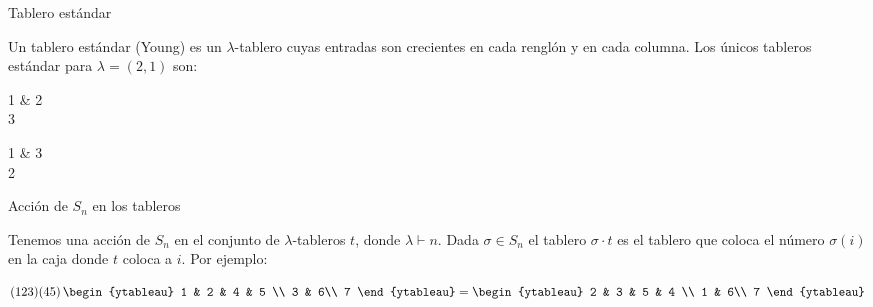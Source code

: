 \documentclass[final,xcolor=svgnames]{beamer}
\begin{document}
\begin{frame}{}
\begin{columns}
\begin{column}{0.5\textwidth}
      \begin{block}{Tablero estándar}
        \begin{minipage}{0.68\linewidth}
          Un \alert{tablero estándar (Young)} es un $\lambda$-tablero
          cuyas entradas son crecientes en cada renglón y en cada
          columna.  Los únicos tableros estándar para $\lambda=(2,1)$
          son:
        \end{minipage}
        \begin{minipage}{0.3\linewidth}
          \begin{center}
            \begin{ytableau}
              1 & 2\\
              3
            \end{ytableau}\quad
            \begin{ytableau}
              1 & 3\\
              2
            \end{ytableau}
          \end{center}
        \end{minipage}
      \end{block}

      \begin{block}{Acción de $S_{n}$ en los tableros}
        \begin{minipage}{0.54\linewidth}
          Tenemos una acción de $S_{n}$ en el conjunto de
          $\lambda$-tableros $t$, donde $\lambda\vdash n$.  Dada
          $\sigma\in S_{n}$ el tablero $\sigma\cdot t$ es el tablero
          que coloca el número $\sigma(i)$ en la caja donde $t$ coloca
          a $i$. Por ejemplo:
        \end{minipage}
        \begin{minipage}{0.42\linewidth}
          \centering
          \begin{equation*}(123)(45)\,
            \begin{ytableau}
              1 & 2 & 4 & 5 \\
              3 & 6\\
              7
            \end{ytableau}
            =
            \begin{ytableau}
              2 & 3 & 5 & 4 \\
              1 & 6\\
              7
            \end{ytableau}
          \end{equation*}
        \end{minipage}
      \end{block}


\end{column}
\end{columns}
\end{frame}
\end{document}
